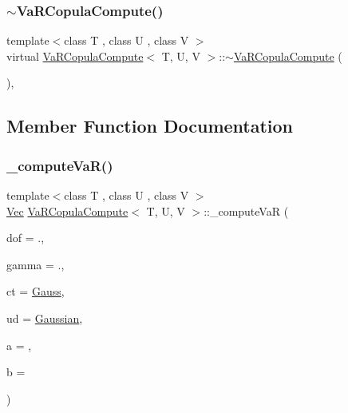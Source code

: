 \subsubsection{\texorpdfstring{$\sim$\+Va\+R\+Copula\+Compute()}{~VaRCopulaCompute()}}
{\footnotesize\ttfamily template$<$class T , class U , class V $>$ \\
virtual \hyperlink{classVaRCopulaCompute}{Va\+R\+Copula\+Compute}$<$ T, U, V $>$\+::$\sim$\hyperlink{classVaRCopulaCompute}{Va\+R\+Copula\+Compute} (\begin{DoxyParamCaption}{ }\end{DoxyParamCaption})\hspace{0.3cm}{\ttfamily [inline]}, {\ttfamily [virtual]}}



\subsection{Member Function Documentation}
\hypertarget{classVaRCopulaCompute_a367ca6f0e63ef6bb493d732435fc9b8d}{}\label{classVaRCopulaCompute_a367ca6f0e63ef6bb493d732435fc9b8d} 
\subsubsection{\texorpdfstring{\+\_\+compute\+Va\+R()}{\_computeVaR()}}
{\footnotesize\ttfamily template$<$class T , class U , class V $>$ \\
\hyperlink{compute__returns__eigen_8h_a1eb6a9306ef406d7975f3cbf2e247777}{Vec} \hyperlink{classVaRCopulaCompute}{Va\+R\+Copula\+Compute}$<$ T, U, V $>$\+::\+\_\+compute\+VaR (\begin{DoxyParamCaption}\item[{double}]{dof = {.},  }\item[{double}]{gamma = {.},  }\item[{\hyperlink{rng_8h_aff2c6be1fded3d6d996b850e2eb87c25}{copula\+Type}}]{ct = {\ttfamily \hyperlink{rng_8h_aff2c6be1fded3d6d996b850e2eb87c25ab15a7891aa5223439e4692a1048cb220}{Gauss}},  }\item[{\hyperlink{mc__engine_8h_aeb3b337d49b67199ac031f705d206198}{underlying\+Process}}]{ud = {\ttfamily \hyperlink{mc__engine_8h_aeb3b337d49b67199ac031f705d206198aa11844f44df96808eb4e519ba04f088c}{Gaussian}},  }\item[{size\+\_\+t}]{a = {},  }\item[{size\+\_\+t}]{b = {} }\end{DoxyParamCaption})\hspace{0.3cm}{\ttfamily [inline]}}



